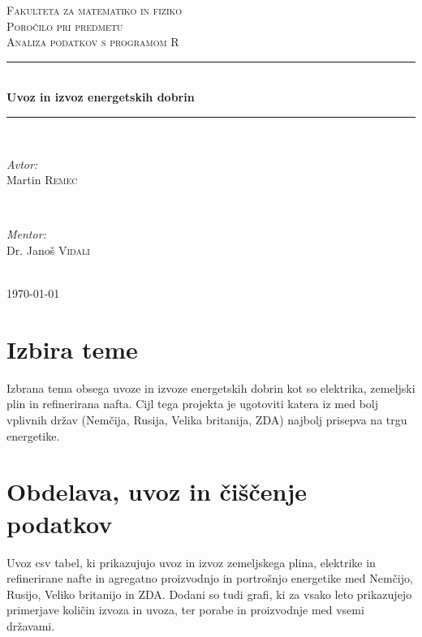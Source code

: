 \documentclass[11pt,a4paper]{article}
\begin{document}
\begin{titlepage}

\newcommand{\HRule}{\rule{\linewidth}{0.5mm}}

\center

\textsc{\LARGE Fakulteta za matematiko in fiziko}\\[1.5cm]
\textsc{\Large Poročilo pri predmetu}\\[0.5cm]
\textsc{\large Analiza podatkov s programom R}\\[0.5cm]
\HRule \\[0.4cm]
{ \huge \bfseries Uvoz in izvoz energetskih dobrin}\\[0.4cm] 
\HRule \\[1.5cm]


\begin{minipage}{0.4\textwidth}
\begin{flushleft} \large
\emph{Avtor:}\\
Martin \textsc{Remec}
\end{flushleft}
\end{minipage}
~
\begin{minipage}{0.4\textwidth}
\begin{flushright} \large
\emph{Mentor:} \\
Dr. Janoš \textsc{Vidali}
\end{flushright}
\end{minipage}\\[4cm]

{\large \today}\\[3cm] 
\vfill

\end{titlepage}


\section{Izbira teme}

Izbrana tema obsega uvoze in izvoze energetskih dobrin kot so elektrika, zemeljski plin in refinerirana nafta. Cijl tega projekta je ugotoviti katera iz med bolj vplivnih držav (Nemčija, Rusija, Velika britanija, ZDA) najbolj prisepva na trgu energetike.

\pagebreak
\section{Obdelava, uvoz in čiščenje podatkov}

Uvoz csv tabel, ki prikazujujo uvoz in izvoz zemeljskega plina, elektrike in refinerirane nafte in agregatno proizvodnjo in portrošnjo energetike med Nemčijo, Rusijo, Veliko britanijo in ZDA. Dodani so tudi grafi, ki za vsako leto prikazujejo primerjave količin izvoza in uvoza, ter porabe in proizvodnje med vsemi državami.
\end{document}
